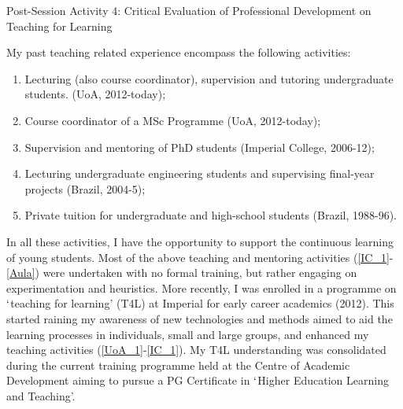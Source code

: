 \documentclass[14pt,twoside]{article}
\begin{document}
\begin{center}
{\Large Post-Session Activity 4: Critical Evaluation of Professional Development on Teaching for Learning}
\end{center}

My past teaching related experience encompass the following activities: 
\begin{enumerate}
%
\item\label{UoA_1} Lecturing (also course coordinator), supervision and tutoring undergraduate students. (UoA, 2012-today);
%
\item\label{UoA_2} Course coordinator of a MSc Programme (UoA, 2012-today);
%
\item\label{IC_1} Supervision and mentoring of PhD students (Imperial College, 2006-12);
%
\item\label{UFRJ} Lecturing undergraduate engineering students and supervising final-year projects (Brazil, 2004-5);
%
\item\label{Aula} Private tuition for undergraduate and high-school students (Brazil, 1988-96). 
%
\end{enumerate}
In all these activities, I have the opportunity to support the continuous learning of young students. Most of the above teaching and mentoring activities (\ref{IC_1}-\ref{Aula}) were undertaken with no formal training, but rather engaging on experimentation and heuristics. More recently, I was enrolled in a programme on $\lq$teaching for learning' (T4L) at Imperial for early career academics (2012). This started raining my awareness of new technologies and methods aimed to aid the learning processes in individuals, small and large groups, and enhanced my teaching activities (\ref{UoA_1}-\ref{IC_1}). My T4L understanding was consolidated during the current training programme held at the Centre of Academic Development aiming to pursue a PG Certificate in $\lq$Higher Education Learning and Teaching'. 
\end{document}
